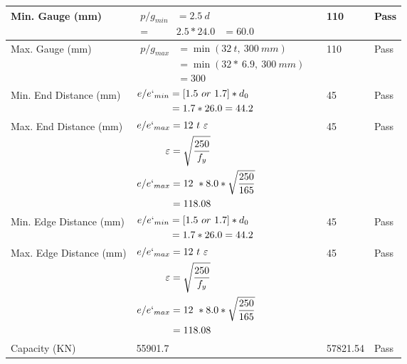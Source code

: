 \documentclass{article}%
\begin{document}
\begin{longtable}{|p{4cm}|p{5cm}|p{5.5cm}|p{1.5cm}|}
\hline%
Min. Gauge (mm)&$\begin{aligned}p/g_{min}&= 2.5 ~ d&\\ =&2.5*24.0&=60.0\end{aligned}$&110&Pass\\%
\hline%
Max. Gauge (mm)&$\begin{aligned}p/g_{max} &=\min(32~t,~300~mm)&\\ &=\min(32 *~6.9,~ 300 ~mm)\\&=300\end{aligned}$&110&Pass\\%
\hline%
Min. End Distance (mm)&$\begin{aligned}e/e`_{min} &=[1.5~or~ 1.7] * d_0\\ &=1.7*26.0=44.2 \end{aligned}$&45&Pass\\%
\hline%
Max. End Distance (mm)&$\begin{aligned}e/e`_{max} &= 12~ t~ \varepsilon&\\ \varepsilon &= \sqrt{\frac{250}{f_y}}\\ e/e`_{max}&=12 ~*8.0*\sqrt{\frac{250}{165}}\\ &=118.08\\ \end{aligned}$&45&Pass\\%
\hline%
Min. Edge Distance (mm)&$\begin{aligned}e/e`_{min} &=[1.5~or~ 1.7] * d_0\\ &=1.7*26.0=44.2 \end{aligned}$&45&Pass\\%
\hline%
Max. Edge Distance (mm)&$\begin{aligned}e/e`_{max} &= 12~ t~ \varepsilon&\\ \varepsilon &= \sqrt{\frac{250}{f_y}}\\ e/e`_{max}&=12 ~*8.0*\sqrt{\frac{250}{165}}\\ &=118.08\\ \end{aligned}$&45&Pass\\%
\hline%
Capacity (KN)&55901.7&57821.54&Pass\\%
\hline%
\end{longtable}

%
\end{document}
